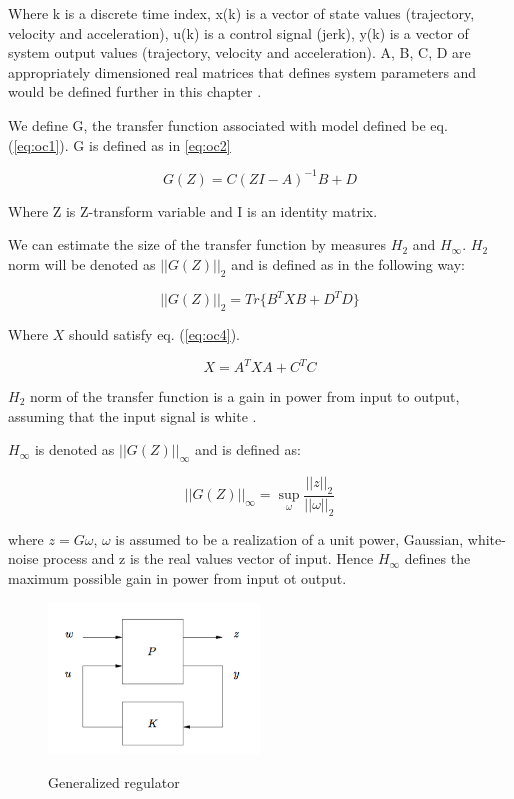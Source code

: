 \documentclass[12pt,a4paper]{report}
\begin{document}
			Where k is a discrete time index, x(k) is a vector of state values (trajectory, velocity and acceleration), u(k) is a control signal (jerk), y(k) is a vector of system output values (trajectory, velocity and acceleration). A, B, C, D are  appropriately dimensioned real matrices that defines system parameters and would be defined further in this chapter \cite{hazell2008discrete}.
			
			We define G, the  transfer function associated with model defined be eq. (\ref{eq:oc1}). G is defined as in \ref{eq:oc2}
			
			\begin{equation}\label{eq:oc2}
				G(Z) = C(ZI - A)^{-1}B+D
			\end{equation}
			
			Where Z is Z-transform variable and I is an identity matrix.
			
			We can estimate the size of the transfer function by measures $H_2$ and $H_\infty$. $H_2$ norm will be denoted as $||G(Z)||_2$ and is defined as in the following way:
			
			\begin{equation}\label{eq:oc3}
				||G(Z)||_2 = Tr\{ B^{T} XB + D^{T} D \}
			\end{equation}
			
			Where $X$ should satisfy eq. (\ref{eq:oc4}).
			
			\begin{equation}\label{eq:oc4}
				X = A^{T} XA + C^{T} C
			\end{equation}
			
			$H_2$ norm of the transfer function is a gain in power from input to output, assuming that the input signal is white \cite{hazell2008discrete}.

			$H_\infty$ is denoted as $||G(Z)||_\infty$ and is defined as:
			
			\begin{equation}\label{eq:oc5}
				||G(Z)||_\infty = \sup_{\omega} \dfrac{||z||_2}{||\omega||_2}
			\end{equation}
			
			where $z = G\omega$, $\omega$ is assumed to be a realization of a unit power, Gaussian, white-noise process and z is the real values vector of input. Hence $H_\infty$ defines the maximum possible gain in power from input ot output.
			
			\begin{figure}[H]
				\vspace{-0.2cm}
				\centering
				{\includegraphics[width=0.5\textwidth]{11}}
				\caption{Generalized regulator \cite{hazell2008discrete}}
				\label{fig:11}
				\vspace{-0.1cm}
			\end{figure}
			
\end{document}
